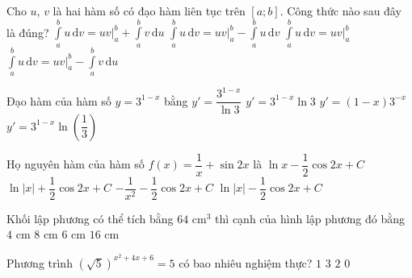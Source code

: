 \begin{ex}%
	Cho $u$, $v$ là hai hàm số có đạo hàm liên tục trên $[a;b]$. Công thức nào sau đây là đúng?
	\choice
	{$\displaystyle\int\limits_a^bu\mathrm{\,d}v=uv\Big|_a^b+\displaystyle\int\limits_a^bv\mathrm{\,d}u$}
	{$\displaystyle\int\limits_a^bu\mathrm{\,d}v=uv\Big|_a^b-\displaystyle\int\limits_a^bu\mathrm{\,d}v$}
	{$\displaystyle\int\limits_a^bu\mathrm{\,d}v=uv\Big|_a^b$}
	{\True $\displaystyle\int\limits_a^bu\mathrm{\,d}v=uv\Big|_a^b-\displaystyle\int\limits_a^bv\mathrm{\,d}u$}
\end{ex}
\begin{ex}%
	Đạo hàm của hàm số $y=3^{1-x}$ bằng
	\choice
	{$y'=\dfrac{3^{1-x}}{\ln3}$}
	{$y'=3^{1-x}\ln3$}
	{$y'=(1-x)3^{-x}$}
	{\True $y'=3^{1-x}\ln\left(\dfrac{1}{3}\right)$}
\end{ex}
\begin{ex}%
	Họ nguyên hàm của hàm số $f(x)=\dfrac{1}{x}+\sin2x$ là
	\choice
	{$\ln x-\dfrac{1}{2}\cos2x+C$}
	{$\ln|x|+\dfrac{1}{2}\cos2x+C$}
	{$-\dfrac{1}{x^2}-\dfrac{1}{2}\cos2x+C$}
	{\True $\ln|x|-\dfrac{1}{2}\cos2x+C$}
\end{ex}
\begin{ex}%
	Khối lập phương có thể tích bằng $64$ cm$^3$ thì cạnh của hình lập phương đó bằng
	\choice
	{\True $4$ cm}
	{$8$ cm}
	{$6$ cm}
	{$16$ cm}
\end{ex}
\begin{ex}%
	Phương trình $\left(\sqrt{5}\right)^{x^2+4x+6}=5$ có bao nhiêu nghiệm thực?
	\choice
	{\True $1$}
	{$3$}
	{$2$}
	{$0$}
\end{ex}
